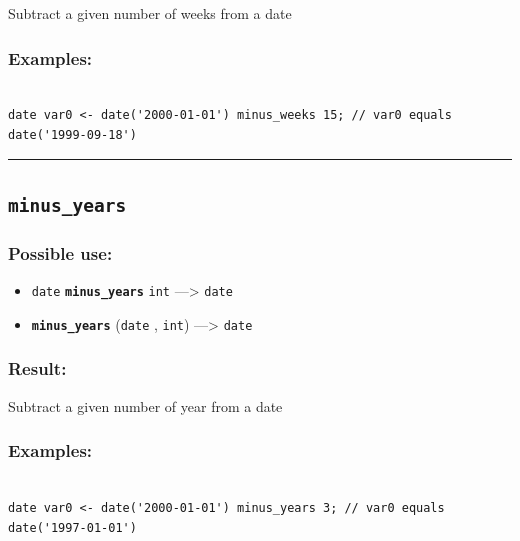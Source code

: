 \documentclass[]{book}
\providecommand{\tightlist}{%
  \setlength{\itemsep}{0pt}\setlength{\parskip}{0pt}}
\theoremstyle{definition}
\theoremstyle{definition}
\theoremstyle{definition}
\theoremstyle{remark}
\begin{document}
Subtract a given number of weeks from a date

\subsubsection{Examples:}\label{examples-248}

\begin{verbatim}
 
date var0 <- date('2000-01-01') minus_weeks 15; // var0 equals date('1999-09-18')
\end{verbatim}

\begin{center}\rule{0.5\linewidth}{\linethickness}\end{center}

\subsection{\texorpdfstring{\texttt{minus\_years}}{minus\_years}}\label{minus_years}

\subsubsection{Possible use:}\label{possible-use-359}

\begin{itemize}
\tightlist
\item
  \texttt{date} \textbf{\texttt{minus\_years}} \texttt{int}
  ---\textgreater{} \texttt{date}
\item
  \textbf{\texttt{minus\_years}} (\texttt{date} , \texttt{int})
  ---\textgreater{} \texttt{date}
\end{itemize}

\subsubsection{Result:}\label{result-348}

Subtract a given number of year from a date

\subsubsection{Examples:}\label{examples-249}

\begin{verbatim}
 
date var0 <- date('2000-01-01') minus_years 3; // var0 equals date('1997-01-01')
\end{verbatim}
\end{document}
